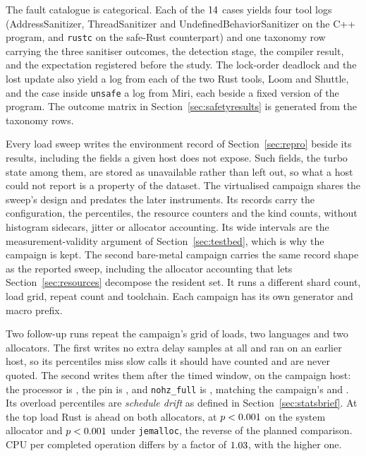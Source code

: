 \documentclass[english,oneside,a4paper,censored,csm,software-track-2020]{HYthesisML}
\begin{document}
\begin{appendices}
The fault catalogue is categorical. Each of the $14$ cases yields four tool logs
(AddressSanitizer, ThreadSanitizer and UndefinedBehaviorSanitizer on the C++ program, and
\texttt{rustc} on the safe-Rust counterpart) and one taxonomy row carrying the three sanitiser
outcomes, the detection stage, the compiler result, and the expectation registered before the
study. The lock-order deadlock and the lost update also yield a log from each of the two
Rust tools, Loom and Shuttle, and the case inside \texttt{unsafe} a log from Miri, each beside
a fixed version of the program. The outcome matrix in Section~\ref{sec:safetyresults} is generated from
the taxonomy rows.

Every load sweep writes the environment record of Section~\ref{sec:repro} beside its results,
including the fields a given host does not expose. Such fields, the turbo state among them, are
stored as unavailable rather than left out, so what a host could not report is a property of
the dataset. The virtualised campaign shares the sweep's design and predates the later
instruments. Its records carry the configuration, the percentiles, the resource counters and
the kind counts, without histogram sidecars, jitter or allocator accounting. Its wide intervals
are the measurement-validity argument of Section~\ref{sec:testbed}, which is why the campaign
is kept. The second bare-metal campaign carries the same record shape as the reported
sweep, including the allocator accounting that lets Section~\ref{sec:resources} decompose the
resident set. It runs a different shard count, load grid, repeat count and toolchain. Each
campaign has its own generator and macro prefix.

Two follow-up runs repeat the campaign's grid of \NLoadLevels{} loads, two languages and two
allocators. The first writes no extra delay samples at all and ran on an earlier host, so its
percentiles miss slow calls it should have counted and are never quoted. The second writes them after the
timed window, on the campaign host: the processor is \ProbeAfterCpu{}, the pin is
\ProbeAfterPinned{}, and \texttt{nohz\_full} is \ProbeAfterNohzFull{}, matching the campaign's
\MainCpu{} and \texttt{\MainNohzFull}. Its overload percentiles are \emph{schedule drift} as
defined in Section~\ref{sec:statsbrief}. At the top load Rust is ahead on both allocators, at
$p <0.001$ on the system allocator and $p <0.001$ under
\texttt{jemalloc}, the reverse of the planned comparison. CPU per completed operation differs
by a factor of $1.03$, with \ProbeAfterCpuPerOpHigher{} the higher one.


\end{appendices}
\end{document}
